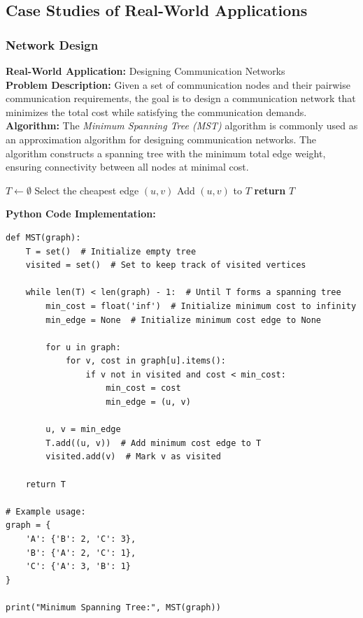 \documentclass[12pt]{book} %
\begin{document}
\subsection{Case Studies of Real-World Applications}

\subsubsection{Network Design}

\textbf{Real-World Application:} Designing Communication Networks \\
\textbf{Problem Description:} Given a set of communication nodes and their pairwise communication requirements, the goal is to design a communication network that minimizes the total cost while satisfying the communication demands. \\
\textbf{Algorithm:} The \textit{Minimum Spanning Tree (MST)} algorithm is commonly used as an approximation algorithm for designing communication networks. The algorithm constructs a spanning tree with the minimum total edge weight, ensuring connectivity between all nodes at minimal cost.
\FloatBarrier
\begin{algorithm}
\caption{Minimum Spanning Tree Algorithm}
\begin{algorithmic}[1]
\State $T \gets \emptyset$ 
    \State Select the cheapest edge $(u, v)$
    \State Add $(u, v)$ to $T$
\EndWhile
\State \textbf{return} $T$
\EndProcedure
\end{algorithmic}
\end{algorithm}
\FloatBarrier
\textbf{Python Code Implementation:}
\FloatBarrier
\begin{lstlisting}
def MST(graph):
    T = set()  # Initialize empty tree
    visited = set()  # Set to keep track of visited vertices
    
    while len(T) < len(graph) - 1:  # Until T forms a spanning tree
        min_cost = float('inf')  # Initialize minimum cost to infinity
        min_edge = None  # Initialize minimum cost edge to None
        
        for u in graph:
            for v, cost in graph[u].items():
                if v not in visited and cost < min_cost:
                    min_cost = cost
                    min_edge = (u, v)
        
        u, v = min_edge
        T.add((u, v))  # Add minimum cost edge to T
        visited.add(v)  # Mark v as visited
    
    return T

# Example usage:
graph = {
    'A': {'B': 2, 'C': 3},
    'B': {'A': 2, 'C': 1},
    'C': {'A': 3, 'B': 1}
}

print("Minimum Spanning Tree:", MST(graph))
\end{lstlisting}
\end{document}
